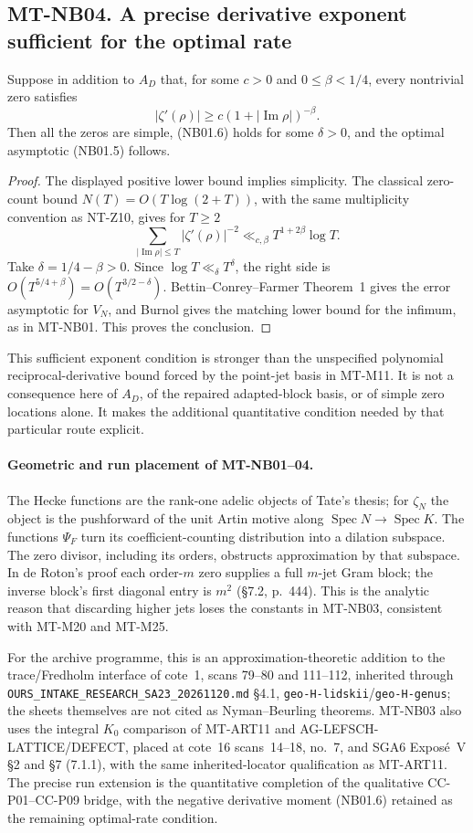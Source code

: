 \subsection*{MT-NB04. A precise derivative exponent sufficient for the optimal rate}

Suppose in addition to $A_D$ that, for some $c>0$ and
$0\le\beta<1/4$, every nontrivial zero satisfies
\[
             |\zeta'(\rho)|\ge c(1+|\operatorname{Im}\rho|)^{-\beta}.
 \tag{NB04.1}
\]
Then all the zeros are simple, (NB01.6) holds for some
$\delta>0$, and the optimal asymptotic (NB01.5) follows.

\begin{proof}
The displayed positive lower bound implies simplicity. The
classical zero-count bound $N(T)=O(T\log(2+T))$, with the
same multiplicity convention as NT-Z10, gives for $T\ge2$
\[
 \sum_{|\operatorname{Im}\rho|\le T}|\zeta'(\rho)|^{-2}
                 \ll_{c,\beta}T^{1+2\beta}\log T.
\]
Take $\delta=1/4-\beta>0$. Since $\log T\ll_\delta T^\delta$,
the right side is $O(T^{5/4+\beta})=O(T^{3/2-\delta})$.
Bettin--Conrey--Farmer Theorem~1 gives the error asymptotic
for $V_N$, and Burnol gives the matching lower bound for
the infimum, as in MT-NB01. This proves the conclusion.
\end{proof}

This sufficient exponent condition is stronger than the
unspecified polynomial reciprocal-derivative bound forced by
the point-jet basis in MT-M11. It is not a consequence here
of $A_D$, of the repaired adapted-block basis, or of simple
zero locations alone. It makes the additional quantitative
condition needed by that particular route explicit.

\paragraph{Geometric and run placement of MT-NB01--04.}
The Hecke functions are the rank-one adelic objects of Tate's
thesis; for $\zeta_N$ the object is the pushforward of the unit
Artin motive along $\operatorname{Spec}N\to\operatorname{Spec}K$.
The functions $\Psi_F$ turn its coefficient-counting distribution
into a dilation subspace. The zero divisor, including its
orders, obstructs approximation by that subspace. In de Roton's
proof each order-$m$ zero supplies a full $m$-jet Gram block;
the inverse block's first diagonal entry is $m^2$ (\S7.2,
p.~444). This is the analytic reason that discarding higher
jets loses the constants in MT-NB03, consistent with MT-M20
and MT-M25.

For the archive programme, this is an approximation-theoretic
addition to the trace/Fredholm interface of cote~1, scans
79--80 and 111--112, inherited through
\texttt{OURS\_INTAKE\_RESEARCH\_SA23\_20261120.md} \S4.1,
\texttt{geo-H-lidskii}/\texttt{geo-H-genus}; the sheets themselves
are not cited as Nyman--Beurling theorems. MT-NB03 also uses
the integral $K_0$ comparison of MT-ART11 and
AG-LEFSCH-LATTICE/DEFECT, placed at cote~16 scans~14--18,
no.~7, and SGA6 Expos\'e~V \S2 and \S7 (7.1.1), with the
same inherited-locator qualification as MT-ART11. The precise
run extension is the quantitative completion of the qualitative
CC-P01--CC-P09 bridge, with the negative derivative moment
(NB01.6) retained as the remaining optimal-rate condition.

